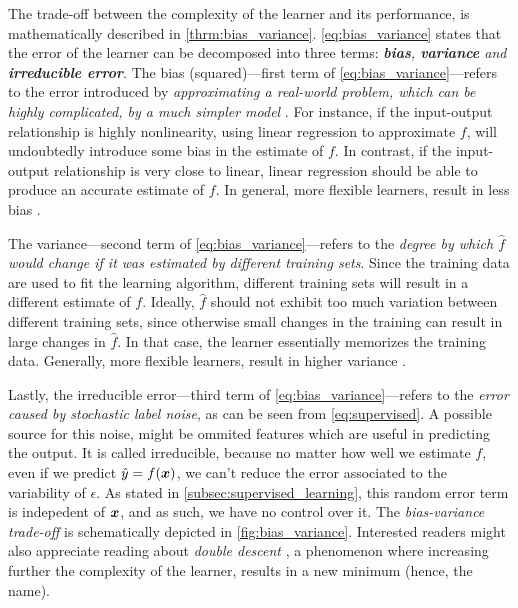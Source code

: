 The trade-off between the complexity of the learner and its
performance, is mathematically described in \Theorem{}
\ref{thrm:bias_variance}. \Equation{} \ref{eq:bias_variance} states that the error
of the learner can be decomposed into three terms:
\emph{\textbf{bias}, \textbf{variance} and
\textbf{irreducible error}}. The bias
(squared)---first term of \Equation{} \ref{eq:bias_variance}---refers to the error
introduced by \emph{approximating a real-world problem, which can be highly
complicated, by a much simpler model} \parencite{introstat, Hastie2009}. For
instance, if the input-output relationship is highly nonlinearity, using linear
regression to approximate $f$, will undoubtedly introduce some bias in the
estimate of $f$. In contrast, if the input-output relationship is very close to
linear, linear regression should be able to produce an accurate estimate of $f$.
In general, more flexible learners, result in less bias
\parencite{introstat, Hastie2009}.

The variance---second term of \Equation{}
\ref{eq:bias_variance}---refers to the \emph{degree by which $\hat{f}$ would
change if it was estimated by different training sets}.
Since the training data are used to fit the learning
algorithm, different training sets will result in a different estimate of $f$.
Ideally, $\hat{f}$ should not exhibit too much variation between different
training sets, since otherwise small changes in the training can result in large
changes in $\hat{f}$. In that case, the learner essentially memorizes the
training data. Generally, more flexible learners, result in higher
variance \parencite{introstat, Hastie2009}.

Lastly, the irreducible error---third term of \Equation{}
\ref{eq:bias_variance}---refers to the \emph{error caused by stochastic label
noise}, as can be seen from \Equation{} \ref{eq:supervised}. A possible source for
this noise, might be ommited features which are useful in
predicting the output. It is called irreducible, because no matter how well we
estimate $f$, even if we predict $\hat{y} = f(\boldsymbol{x})$, we can't reduce the error
associated to the variability of $\epsilon$. As stated in \Section{}
\ref{subsec:supervised_learning}, this random error term is indepedent of
$\boldsymbol{x}$, and as such, we have no control over it. The \emph{bias-variance
trade-off} is schematically depicted in \Figure{}
\ref{fig:bias_variance}. Interested readers might also appreciate reading about
\emph{double descent} \parencite{Nakkiran2019}, a
phenomenon where increasing further the complexity of the learner, results in a
new minimum (hence, the name).

